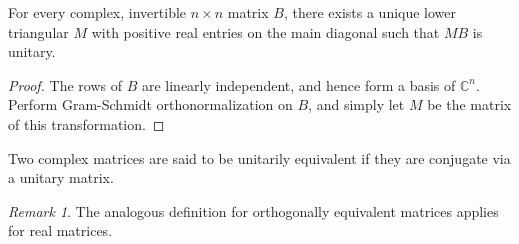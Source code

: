 \documentclass[11pt]{article}
\newcommand{\C}{\mathbb{C}}
\theoremstyle{definition}
\theoremstyle{remark}
\newtheorem*{remark}{Remark}
\numberwithin{equation}{section}
\begin{document}
    \begin{theorem}
        For every complex, invertible $n \times n$ matrix $B$, there exists a unique
        lower triangular $M$ with positive real entries on the main diagonal such
        that $MB$ is unitary.
    \end{theorem}
    \begin{proof}
        The rows of $B$ are linearly independent, and hence form a basis of $\C^n$.
        Perform Gram-Schmidt orthonormalization on $B$, and simply let $M$ be the
        matrix of this transformation.
    \end{proof}


    \begin{definition}
        Two complex matrices are said to be unitarily equivalent if they are
        conjugate via a unitary matrix.
        \begin{remark}
            The analogous definition for orthogonally equivalent matrices applies
            for real matrices.
        \end{remark}
    \end{definition}

    
\end{document}
